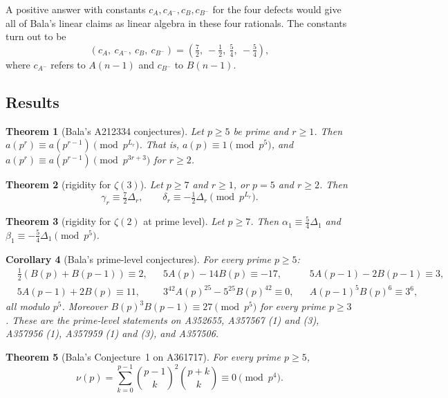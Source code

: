 \documentclass[11pt]{amsart}
\newtheorem{theorem}{Theorem}[section]
\newtheorem{corollary}[theorem]{Corollary}
\theoremstyle{definition}
\theoremstyle{remark}
\newcommand{\bin}[2]{\binom{#1}{#2}}
\begin{document}
A positive answer with constants $c_A,c_{A^-},c_B,c_{B^-}$ for the four defects would give all
of Bala's linear claims as linear algebra in these four rationals. The constants turn out to be
\[
(c_A,\ c_{A^-},\ c_B,\ c_{B^-})=\left(\tfrac72,\ -\tfrac12,\ \tfrac54,\ -\tfrac54\right),
\]
where $c_{A^-}$ refers to $A(n-1)$ and $c_{B^-}$ to $B(n-1)$.

\subsection{Results}
\begin{theorem}[Bala's A212334 conjectures]\label{thm:A212334}
Let $p\ge5$ be prime and $r\ge1$. Then $a(p^r)\equiv a(p^{r-1})\pmod{p^{L_r}}$.
That is, $a(p)\equiv1\pmod{p^5}$, and $a(p^r)\equiv a(p^{r-1})\pmod{p^{3r+3}}$ for $r\ge2$.
\end{theorem}

\begin{theorem}[rigidity for $\zeta(3)$]\label{thm:W}
Let $p\ge 7$ and $r\ge1$, or $p=5$ and $r\ge2$. Then
\[
\gamma_r\equiv\tfrac72\Delta_r,\qquad \delta_r\equiv-\tfrac12\Delta_r\pmod{p^{L_r}}.
\]
\end{theorem}

\begin{theorem}[rigidity for $\zeta(2)$ at prime level]\label{thm:Z1}
Let $p\ge7$. Then $\alpha_1\equiv\tfrac54\Delta_1$ and $\beta_1\equiv-\tfrac54\Delta_1\pmod{p^5}$.
\end{theorem}

\begin{corollary}[Bala's prime-level conjectures]\label{cor:prime}
For every prime $p\ge5$:
\begin{align*}
&\tfrac12(B(p)+B(p-1))\equiv2, && 5A(p)-14B(p)\equiv-17, && 5A(p-1)-2B(p-1)\equiv3,\\
&5A(p-1)+2B(p)\equiv 11, && 3^{42}A(p)^{25}-5^{25}B(p)^{42}\equiv0, && A(p-1)^5B(p)^6\equiv 3^6,
\end{align*}
all modulo $p^5$. Moreover $B(p)^3B(p-1)\equiv 27\pmod{p^5}$ for every prime $p\ge3$.
These are the prime-level statements on A352655, A357567 (1) and (3),
A357956 (1), A357959 (1) and (3), and A357506.
\end{corollary}

\begin{theorem}[Bala's Conjecture~1 on A361717]\label{thm:nu}
For every prime $p\ge 5$,
\[
\nu(p)=\sum_{k=0}^{p-1}\bin{p-1}k^2\bin{p+k}k\equiv0\pmod{p^4}.
\]
\end{theorem}
\end{document}
